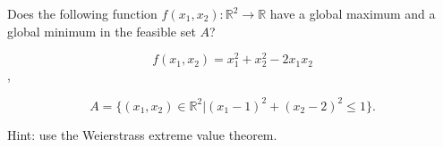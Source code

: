 
Does the following function $f(x_1,x_2) : \mathbb{R}^2 \rightarrow \mathbb{R}$ have a global maximum and a global minimum in the feasible set $A$?

$$f(x_1,x_2)= x_1^2 +x_2^2 -2 x_1 x_2$$,

$$ A=\big\{(x_1, x_2) \in \mathbb{R}^2|(x_1 - 1)^2 + (x_2 - 2)^2 \leq 1 \big\}. $$

Hint: use the Weierstrass extreme value theorem.
